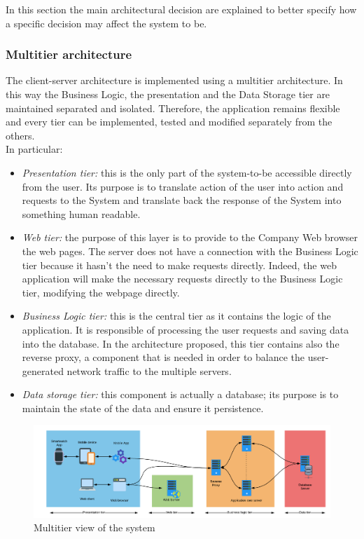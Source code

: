 In this section the main architectural decision are explained to better specify how a specific decision may affect 
the system to be.
\subsubsection{Multitier architecture}
The client-server architecture is implemented using a multitier architecture. In this way the Business Logic, the presentation and the Data Storage tier are maintained separated and isolated. Therefore, the application remains flexible and every tier can be implemented, tested and modified separately from the others.\\
In particular:

\begin{itemize}
    \item \textit{Presentation tier:} this is the only part of the system-to-be accessible directly from the user. Its purpose is to translate action of the user into action and requests to the System and translate back the response of the System into something human readable.
    
    
    \item \textit{Web tier:} the purpose of this layer is to provide to the Company Web browser the web pages. The server does not have a connection with the Business Logic tier because it hasn't the need to make requests directly. Indeed, the web application will make the necessary requests directly to the Business Logic tier, modifying the webpage directly.
    
    \item \textit{Business Logic tier:} this is the central tier as it contains the logic of the application. It is responsible of processing the user requests and saving data into the database. In the architecture proposed, this tier contains also the reverse proxy, a component that is needed in order to balance the user-generated network traffic to the multiple servers.
    
    \item \textit{Data storage tier:} this component is actually a database; its purpose is to maintain the state of the data and ensure it persistence.
\end{itemize}
\begin{figure}[H]
	\includegraphics[width=\textwidth,height=\textheight,keepaspectratio]{assets/MultiTierSystem.pdf}
	\caption{Multitier view of the system}
	\label{fig:MultiTierSystem}
\end{figure}

